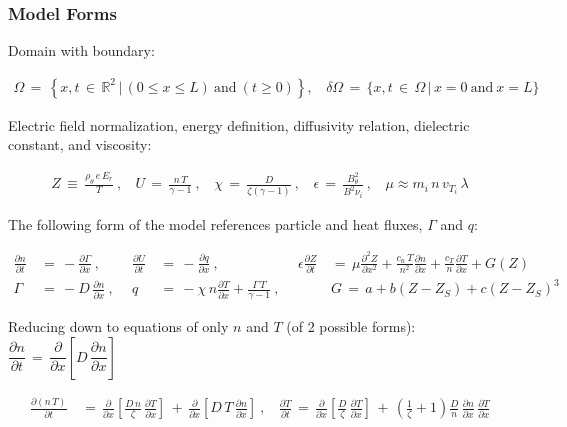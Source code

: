 \documentclass[a4paper,8pt]{article}
\begin{document}
\normalsize

\subsubsection{Model Forms}\label{model-forms}

Domain with boundary: \small

\begin{align}
    \Omega \,=\, \left\{x, t \,\in\, \mathbb{R}^2 \,|\, (0 \leq x \leq L)
        ~\text{and}~ (t \geq 0)\right\}, ~~~~ \delta\Omega \,=\,
        \{x, t \,\in\, \Omega \,|\, x = 0 ~\text{and}~ x = L \}
\end{align}

\normalsize

Electric field normalization, energy definition, diffusivity relation,
dielectric constant, and viscosity: \small

\begin{align}
    Z \,\equiv\, \frac{\rho_\theta \, e \, E_r}{T}~, ~~~~
        U \,=\, \frac{n\,T}{\gamma - 1}~, ~~~~
        \chi \,=\, \frac{D}{\zeta(\gamma - 1)}~, ~~~~
        \epsilon \,=\, \frac{B_\theta^2}{B^2 \nu_i}~, ~~~~
        \mu \approx m_i \, n \, v_{T_i} \, \lambda
\end{align}

\normalsize

The following form of the model references particle and heat fluxes,
\(\Gamma\) and \(q\): \small

\begin{align}
    \frac{\partial n}{\partial t} \,&=\, -\frac{\partial \Gamma}{\partial x}~,~~&
    \frac{\partial U}{\partial t} \,&=\, -\frac{\partial q}{\partial x}~,~~&
    \epsilon \frac{\partial Z}{\partial t} \,&=\,
        \mu \frac{\partial^2 Z}{\partial x^2} + \frac{c_n \, T}{n^2}
        \frac{\partial n}{\partial x} +
        \frac{c_T}{n} \frac{\partial T}{\partial x} + G(Z) \\
    \Gamma \,&=\, -D \, \frac{\partial n}{\partial x}~,~~&
    q \,&=\, -\chi \, n \frac{\partial T}{\partial x} +
        \frac{\Gamma\,T}{\gamma - 1}~,~~&
    &G \,=\, a + b(Z - Z_S) + c(Z - Z_S)^3
\end{align}

\normalsize

Reducing down to equations of only \(n\) and \(T\) (of 2 possible
forms):
\(\dfrac{\partial n}{\partial t} \,=\, \dfrac{\partial}{\partial x}\left[D \, \dfrac{\partial n}{\partial x}\right]\)
\small

\begin{align}
    \frac{\partial(n\,T)}{\partial t} \,&=\,
        \frac{\partial}{\partial x}\left[\frac{D\,n}{\zeta} \,
        \frac{\partial T}{\partial x}\right] \,+\,
        \frac{\partial}{\partial x}\left[D\,T \,
        \frac{\partial n}{\partial x}\right]~, ~~~~
        \frac{\partial T}{\partial t} \,=\, \frac{\partial }{\partial x}
        \left[\frac{D}{\zeta} \, \frac{\partial T}{\partial x}\right] \,+\,
        \left(\frac{1}{\zeta} + 1\right) \frac{D}{n} \,
        \frac{\partial n}{\partial x} \, \frac{\partial T}{\partial x}
\end{align}
\end{document}
